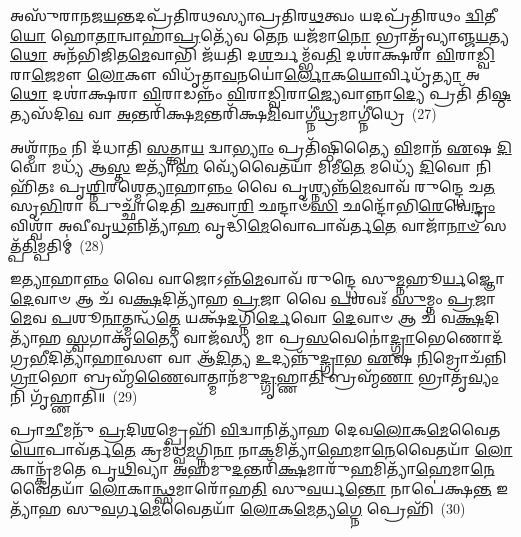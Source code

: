 𑌅𑌸𑍁᳴𑌰𑌾𑌨𑌜\-\ul{𑌯}\-𑌨𑍍𑌤𑌦𑌪𑍍𑌰᳴𑌤𑌿𑌰𑌥𑌸𑍍𑌯𑌾𑌪𑍍𑌰𑌤𑌿𑌰\-\ul{𑌥}\-𑌤𑍍𑌵𑌂 𑌯𑌦𑌪𑍍𑌰᳴𑌤𑌿𑌰𑌥𑌂 \ul{𑌦𑍍𑌵𑌿}\-𑌤𑍀\-\ul{𑌯𑍋} 𑌹𑍋\-\ul{𑌤𑌾}\-𑌨𑍍𑌵𑌾𑌹𑌾॑\-\ul{𑌪𑍍𑌰}\-𑌤𑍍𑌯𑍇᳴𑌵 𑌤𑍇\-\ul{𑌨} 𑌯𑌜᳴𑌮𑌾\-\ul{𑌨𑍋} 𑌭𑍍𑌰𑌾𑌤𑍃᳴𑌵𑍍𑌯𑌾𑌞𑍍𑌜\-\ul{𑌯}\-𑌤𑍍𑌯\-\ul{𑌥𑍋} 𑌅𑌨᳴𑌭𑌿𑌜𑌿𑌤\-\ul{𑌮𑍇}\-𑌵𑌾𑌭𑌿 𑌜᳴𑌯𑌤𑌿 𑌦\-\ul{𑌶}\-𑌰𑍍𑌚𑌮𑍍𑌭᳴𑌵\-\ul{𑌤𑌿} 𑌦𑌶𑌾॑𑌕𑍍𑌷𑌰𑌾 \ul{𑌵𑌿}\-𑌰𑌾\-\ul{𑌡𑍍𑌵𑌿}\-𑌰𑌾\-\ul{𑌜𑍇}\-𑌮𑍗 \ul{𑌲𑍋}\-𑌕𑍗 𑌵𑌿𑌧𑍃᳴𑌤𑌾\-\ul{𑌵}\-𑌨𑌯𑍋॑\-\ul{𑌰𑍍𑌲𑍋}\-𑌕\-\ul{𑌯𑍋}\-𑌰𑍍𑌵𑌿𑌧𑍃᳴\-\ul{𑌤𑍍𑌯𑌾} 𑌅\-\ul{𑌥𑍋} 𑌦𑌶𑌾॑𑌕𑍍𑌷𑌰𑌾 \ul{𑌵𑌿}\-𑌰𑌾𑌡𑌨𑍍𑌨𑌂᳴ \ul{𑌵𑌿}\-𑌰𑌾\-\ul{𑌡𑍍𑌵𑌿}\-𑌰𑌾\-\ul{𑌜𑍍𑌯𑍇}\-𑌵𑌾𑌨𑍍𑌨𑌾\-\ul{𑌦𑍍𑌯𑍇} 𑌪𑍍𑌰𑌤𑌿᳴ 𑌤𑌿\-\ul{𑌷𑍍𑌠}\-𑌤𑍍𑌯𑌸᳴𑌦𑌿\-\ul{𑌵} 𑌵𑌾 \ul{𑌅}\-𑌨𑍍𑌤𑌰𑌿᳴𑌕𑍍𑌷\-\ul{𑌮}\-𑌨𑍍𑌤𑌰𑌿᳴𑌕𑍍𑌷\-\ul{𑌮𑌿}\-𑌵𑌾𑌗𑍍𑌨𑍀॑\-\ul{𑌧𑍍𑌰}\-𑌮𑌾𑌗𑍍𑌨𑍀॑𑌧𑍍𑌰𑍇~(27)

𑌅𑌶𑍍𑌮𑌾᳴\-\ul{𑌨𑌂} 𑌨𑌿 𑌦᳴𑌧𑌾𑌤𑌿 \ul{𑌸}\-𑌤𑍍𑌤𑍍𑌵𑌾\-\ul{𑌯} 𑌦𑍍𑌵𑌾\-\ul{𑌭𑍍𑌯𑌾𑌂} 𑌪𑍍𑌰𑌤𑌿᳴𑌷𑍍𑌠𑌿𑌤𑍍𑌯𑍈 \ul{𑌵𑌿}\-𑌮𑌾𑌨᳴ \ul{𑌏}\-𑌷 \ul{𑌦𑌿}\-𑌵𑍋 𑌮𑌧𑍍𑌯᳴ 𑌆\-\ul{𑌸𑍍𑌤} 𑌇𑌤𑍍𑌯𑌾᳴\-\ul{𑌹} 𑌵𑍍𑌯𑍇᳴𑌵𑍈𑌤𑌯𑌾᳴ 𑌮𑌿𑌮𑍀\-\ul{𑌤𑍇} 𑌮𑌧𑍍𑌯𑍇᳴ \ul{𑌦𑌿}\-𑌵𑍋 𑌨𑌿𑌹𑌿᳴𑌤𑌃 𑌪𑍃\-\ul{𑌶𑍍𑌨𑌿}\-𑌰𑌶𑍍𑌮𑍇\-\ul{𑌤𑍍𑌯𑌾}\-𑌹𑌾\-\ul{𑌨𑍍𑌨𑌂} 𑌵𑍈 𑌪𑍃𑌶𑍍𑌨𑍍𑌯𑌨𑍍𑌨᳴\-\ul{𑌮𑍇}\-𑌵𑌾𑌵᳴ 𑌰𑍁𑌨𑍍𑌦𑍍𑌧𑍇 𑌚\-\ul{𑌤}\-𑌸𑍃\-\ul{𑌭𑌿}\-𑌰𑌾 𑌪𑍁𑌚𑍍𑌛𑌾᳴𑌦𑍇𑌤𑌿 \ul{𑌚}\-𑌤𑍍𑌵𑌾\-\ul{𑌰𑌿} 𑌛𑌨𑍍𑌦𑌾𑍞᳴\-\ul{𑌸𑌿} 𑌛𑌨𑍍𑌦𑍋᳴𑌭𑌿\-\ul{𑌰𑍇}\-𑌵𑍇\-\ul{𑌨𑍍𑌦𑍍𑌰𑌂} 𑌵𑌿𑌶𑍍𑌵𑌾᳴ 𑌅𑌵𑍀𑌵𑍃\-\ul{𑌧}\-𑌨𑍍𑌨𑌿𑌤𑍍𑌯𑌾᳴\-\ul{𑌹} 𑌵𑍃𑌦𑍍𑌧𑌿᳴\-\ul{𑌮𑍇}\-𑌵𑍋𑌪𑌾𑌵᳴𑌰𑍍𑌤\-\ul{𑌤𑍇} 𑌵𑌾𑌜𑌾᳴\-\ul{𑌨𑌾}\-\-\ul{𑍞} 𑌸𑌤𑍍𑌪᳴\-\ul{𑌤𑌿}\-𑌮𑍍𑌪𑌤𑌿𑌮𑍍॑~(28)

𑌇\-\ul{𑌤𑍍𑌯𑌾}\-𑌹𑌾\-\ul{𑌨𑍍𑌨𑌂} 𑌵𑍈 𑌵𑌾𑌜𑍋\-𑌽𑌨𑍍𑌨᳴\-\ul{𑌮𑍇}\-𑌵𑌾𑌵᳴ 𑌰𑍁𑌨𑍍𑌦𑍍𑌧𑍇 𑌸𑍁\-\ul{𑌮𑍍𑌨}\-𑌹𑍂\-\ul{𑌰𑍍𑌯}\-𑌜𑍍𑌞𑍋 \ul{𑌦𑍇}\-𑌵𑌾𑍞 𑌆 𑌚᳴ 𑌵\-\ul{𑌕𑍍𑌷}\-𑌦𑌿𑌤𑍍𑌯𑌾᳴𑌹 \ul{𑌪𑍍𑌰}\-𑌜𑌾 𑌵𑍈 \ul{𑌪}\-𑌶𑌵𑌃᳴ \ul{𑌸𑍁}\-𑌮𑍍𑌨𑌂 \ul{𑌪𑍍𑌰}\-𑌜𑌾\-\ul{𑌮𑍇}\-𑌵 \ul{𑌪}\-𑌶𑍂\-\ul{𑌨𑌾}\-𑌤𑍍𑌮𑌨𑍍𑌧᳴\-\ul{𑌤𑍍𑌤𑍇} 𑌯𑌕𑍍𑌷᳴\-\ul{𑌦}\-𑌗𑍍𑌨𑌿\-\ul{𑌰𑍍𑌦𑍇}\-𑌵𑍋 \ul{𑌦𑍇}\-𑌵𑌾𑍞 𑌆 𑌚᳴ 𑌵\-\ul{𑌕𑍍𑌷}\-𑌦𑌿𑌤𑍍𑌯𑌾᳴𑌹 \ul{𑌸𑍍𑌵}\-𑌗𑌾𑌕𑍃᳴\-\ul{𑌤𑍍𑌯𑍈} 𑌵𑌾𑌜᳴𑌸𑍍𑌯 𑌮𑌾 𑌪𑍍𑌰\-\ul{𑌸}\-𑌵𑍇𑌨𑍋॑\-\ul{𑌦𑍍𑌗𑍍𑌰𑌾}\-𑌭𑍇𑌣𑍋𑌦᳴𑌗𑍍𑌰\-\ul{𑌭𑍀}\-𑌦𑌿𑌤𑍍𑌯𑌾᳴\-\ul{𑌹𑌾}\-𑌸𑍗 𑌵𑌾 𑌆᳴\-\ul{𑌦𑌿}\-𑌤𑍍𑌯 \ul{𑌉}\-𑌦𑍍𑌯𑌨𑍍𑌨𑍁᳴\-\ul{𑌦𑍍𑌗𑍍𑌰𑌾}\-𑌭 \ul{𑌏}\-𑌷 \ul{𑌨𑌿}\-𑌮𑍍𑌰𑍋𑌚᳴𑌨𑍍𑌨𑌿\-\ul{𑌗𑍍𑌰𑌾}\-𑌭𑍋 𑌬𑍍𑌰𑌹𑍍𑌮᳴\-\ul{𑌣𑍈}\-𑌵𑌾𑌤𑍍𑌮𑌾𑌨᳴𑌮𑍁\-\ul{𑌦𑍍𑌗𑍃}\-𑌹𑍍𑌣𑌾\-\ul{𑌤𑌿} 𑌬𑍍𑌰𑌹𑍍𑌮᳴\-\ul{𑌣𑌾} 𑌭𑍍𑌰𑌾𑌤𑍃᳴\-\ul{𑌵𑍍𑌯𑌂} 𑌨𑌿 𑌗𑍃᳴𑌹𑍍𑌣𑌾𑌤𑌿॥~(29)

{\anuvakamend[{\-\ul{𑌪𑍍𑌰𑌾}\-𑌣𑍈𑌃 𑌪𑍋𑌷𑍋॑\-𑌽\-\ul{𑌪𑍍𑌰}\-𑌤𑍍𑌯𑌾𑌗𑍍𑌨𑍀॑\-\ul{𑌧𑍍𑌰𑍇} 𑌪𑌤𑌿᳴\-\ul{𑌮𑍇}\-𑌷 𑌦𑌶᳴ 𑌚}]}%

𑌪𑍍𑌰𑌾\-\ul{𑌚𑍀}\-𑌮𑌨𑍁᳴ \ul{𑌪𑍍𑌰}\-𑌦𑌿\-\ul{𑌶}\-𑌮𑍍𑌪𑍍𑌰𑍇𑌹𑌿᳴ \ul{𑌵𑌿}\-𑌦𑍍𑌵𑌾𑌨𑌿𑌤𑍍𑌯𑌾᳴𑌹 𑌦𑍇𑌵\-\ul{𑌲𑍋}\-𑌕\-\ul{𑌮𑍇}\-𑌵𑍈𑌤\-\ul{𑌯𑍋}\-𑌪𑌾𑌵᳴𑌰𑍍𑌤\-\ul{𑌤𑍇} 𑌕𑍍𑌰𑌮᳴𑌧𑍍𑌵\-\ul{𑌮}\-𑌗𑍍𑌨𑌿\-\ul{𑌨𑌾} 𑌨𑌾\-\ul{𑌕}\-𑌮𑌿𑌤𑍍𑌯𑌾᳴\-\ul{𑌹𑍇}\-𑌮𑌾\-\ul{𑌨𑍇}\-𑌵𑍈𑌤𑌯𑌾᳴ \ul{𑌲𑍋}\-𑌕𑌾𑌨𑍍𑌕𑍍𑌰᳴𑌮𑌤𑍇 𑌪𑍃\-\ul{𑌥𑌿}\-𑌵𑍍𑌯𑌾 \ul{𑌅}\-𑌹𑌮𑍁\-\ul{𑌦}\-𑌨𑍍𑌤𑌰𑌿᳴\-\ul{𑌕𑍍𑌷}\-𑌮𑌾𑌰𑍁᳴\-\ul{𑌹}\-𑌮𑌿𑌤𑍍𑌯𑌾᳴\-\ul{𑌹𑍇}\-𑌮𑌾\-\ul{𑌨𑍇}\-𑌵𑍈𑌤𑌯𑌾᳴ \ul{𑌲𑍋}\-𑌕𑌾\-\ul{𑌨𑍍𑌥𑍍𑌸}\-𑌮𑌾𑌰𑍋᳴𑌹\-\ul{𑌤𑌿} 𑌸𑍁\-\ul{𑌵}\-𑌰𑍍𑌯\-\ul{𑌨𑍍𑌤𑍋} 𑌨𑌾𑌪𑍇॑𑌕𑍍𑌷\-\ul{𑌨𑍍𑌤} 𑌇𑌤𑍍𑌯𑌾᳴𑌹 𑌸𑍁\-\ul{𑌵}\-𑌰𑍍𑌗\-\ul{𑌮𑍇}\-𑌵𑍈𑌤𑌯𑌾᳴ \ul{𑌲𑍋}\-𑌕\-\ul{𑌮𑍇}\-𑌤𑍍𑌯\-\ul{𑌗𑍍𑌨𑍇} 𑌪𑍍𑌰𑍇𑌹𑌿᳴~(30)

